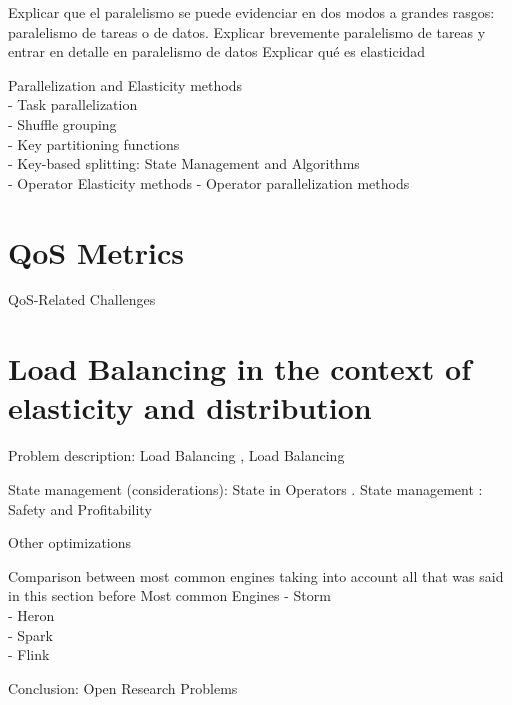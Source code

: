   Explicar que el paralelismo se puede evidenciar en dos modos a grandes
  rasgos: paralelismo de tareas o de datos. Explicar brevemente paralelismo de
  tareas y entrar en detalle en paralelismo de datos
  Explicar qué es elasticidad

  Parallelization and Elasticity methods \cite{R_ger_2019}\\
  - Task parallelization \cite{R_ger_2019}\\
  - Shuffle grouping \cite{R_ger_2019}\\
  - Key partitioning functions \cite{R_ger_2019}\\
  - Key-based splitting: State Management and Algorithms \cite{R_ger_2019}\\
  - Operator Elasticity methods \cite{R_ger_2019}
  - Operator parallelization methods \cite{R_ger_2019}


  \section{QoS Metrics}
  QoS-Related Challenges\cite{chakravarthy2009stream}
  \section{Load Balancing in the context of elasticity and distribution}

  Problem description: Load Balancing  \cite{Hirzel_2014},   Load Balancing \cite{R_ger_2019}

  State management (considerations): State in Operators \cite{R_ger_2019}. State management \cite{R_ger_2019}: Safety and Profitability \cite{Schneider_2013}\cite{R_ger_2019}

  Other optimizations

  Comparison between most common engines taking into account all that was said in this section before
  Most common Engines  \cite{kamburugamuve2013survey}
  - Storm  \cite{kamburugamuve2013survey} \cite{R_ger_2019}\\
  - Heron \cite{R_ger_2019}\\
  - Spark \cite{R_ger_2019}\\
  - Flink \cite{R_ger_2019}

  Conclusion: Open Research Problems \cite{Schneider_2013}

